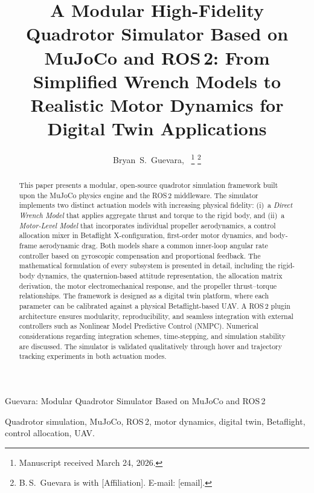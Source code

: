\documentclass[journal]{IEEEtran}
\begin{document}
\title{A Modular High-Fidelity Quadrotor Simulator Based on MuJoCo and ROS\,2: From Simplified Wrench Models to Realistic Motor Dynamics for Digital Twin Applications}

\author{Bryan~S.~Guevara,~\IEEEmembership{}
  \thanks{Manuscript received March 24, 2026.}
  \thanks{B.\,S.~Guevara is with [Affiliation]. E-mail: [email].}
}

{Guevara: Modular Quadrotor Simulator Based on MuJoCo and ROS\,2}

\maketitle

\begin{abstract}
This paper presents a modular, open-source quadrotor simulation framework built upon the MuJoCo physics engine and the ROS\,2 middleware. The simulator implements two distinct actuation models with increasing physical fidelity: (i)~a \emph{Direct Wrench Model} that applies aggregate thrust and torque to the rigid body, and (ii)~a \emph{Motor-Level Model} that incorporates individual propeller aerodynamics, a control allocation mixer in Betaflight X-configuration, first-order motor dynamics, and body-frame aerodynamic drag. Both models share a common inner-loop angular rate controller based on gyroscopic compensation and proportional feedback. The mathematical formulation of every subsystem is presented in detail, including the rigid-body dynamics, the quaternion-based attitude representation, the allocation matrix derivation, the motor electromechanical response, and the propeller thrust--torque relationships. The framework is designed as a digital twin platform, where each parameter can be calibrated against a physical Betaflight-based UAV. A ROS\,2 plugin architecture ensures modularity, reproducibility, and seamless integration with external controllers such as Nonlinear Model Predictive Control (NMPC). Numerical considerations regarding integration schemes, time-stepping, and simulation stability are discussed. The simulator is validated qualitatively through hover and trajectory tracking experiments in both actuation modes.
\end{abstract}

\begin{IEEEkeywords}
Quadrotor simulation, MuJoCo, ROS\,2, motor dynamics, digital twin, Betaflight, control allocation, UAV.
\end{IEEEkeywords}
\end{document}

